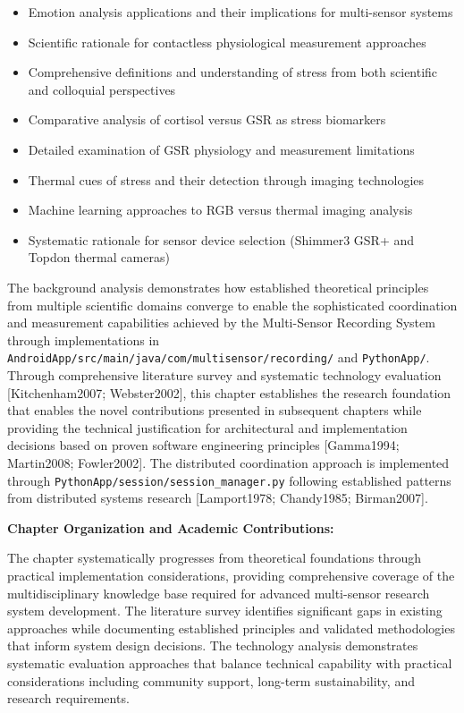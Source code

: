 \documentclass[11pt,a4paper]{article}
\begin{document}
\begin{itemize}
\item Emotion analysis applications and their implications for multi-sensor systems
\item Scientific rationale for contactless physiological measurement approaches
\item Comprehensive definitions and understanding of stress from both scientific and colloquial perspectives
\item Comparative analysis of cortisol versus GSR as stress biomarkers
\item Detailed examination of GSR physiology and measurement limitations
\item Thermal cues of stress and their detection through imaging technologies
\item Machine learning approaches to RGB versus thermal imaging analysis
\item Systematic rationale for sensor device selection (Shimmer3 GSR+ and Topdon thermal cameras)

\end{itemize}
The background analysis demonstrates how established theoretical principles from multiple scientific domains converge to
enable the sophisticated coordination and measurement capabilities achieved by the Multi-Sensor Recording System through
implementations in \texttt{AndroidApp/src/main/java/com/multisensor/recording/} and \texttt{PythonApp/}. Through comprehensive
literature survey and systematic technology evaluation [Kitchenham2007; Webster2002], this chapter establishes the
research foundation that enables the novel contributions presented in subsequent chapters while providing the technical
justification for architectural and implementation decisions based on proven software engineering
principles [Gamma1994; Martin2008; Fowler2002]. The distributed coordination approach is implemented through
\texttt{PythonApp/session/session\_manager.py} following established patterns from distributed systems
research [Lamport1978; Chandy1985; Birman2007].

\textbf{Chapter Organization and Academic Contributions:}

The chapter systematically progresses from theoretical foundations through practical implementation considerations,
providing comprehensive coverage of the multidisciplinary knowledge base required for advanced multi-sensor research
system development. The literature survey identifies significant gaps in existing approaches while documenting
established principles and validated methodologies that inform system design decisions. The technology analysis
demonstrates systematic evaluation approaches that balance technical capability with practical considerations including
community support, long-term sustainability, and research requirements.
\end{document}
